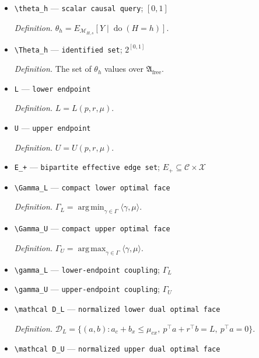 \documentclass{article}
\begin{document}
\begin{itemize}
  \par\smallskip\noindent\emph{Definition.} \(\Gamma=\Gamma(p,r)\).
  \item \texttt{\textbackslash{}\allowbreak{}theta\_\allowbreak{}h} --- \texttt{scalar causal query}; \([0,1]\)
  \par\smallskip\noindent\emph{Definition.} \(\theta_h=E_{\mathcal M_{H,s}}[Y\mid\operatorname{do}(H=h)]\).
  \item \texttt{\textbackslash{}\allowbreak{}Theta\_\allowbreak{}h} --- \texttt{identified set}; \(2^{[0,1]}\)
  \par\smallskip\noindent\emph{Definition.} The set of \(\theta_h\) values over \(\mathfrak A_{\mathrm{free}}\).
  \item \texttt{L} --- \texttt{lower endpoint}
  \par\smallskip\noindent\emph{Definition.} \(L=L(p,r,\mu)\).
  \item \texttt{U} --- \texttt{upper endpoint}
  \par\smallskip\noindent\emph{Definition.} \(U=U(p,r,\mu)\).
  \item \texttt{E\_\allowbreak{}+\allowbreak{}} --- \texttt{bipartite effective edge set}; \(E_+\subseteq\mathcal C\times\mathcal X\)
  \item \texttt{\textbackslash{}\allowbreak{}Gamma\_\allowbreak{}L} --- \texttt{compact lower optimal face}
  \par\smallskip\noindent\emph{Definition.} \(\Gamma_L=\operatorname*{arg\,min}_{\gamma\in\Gamma}\langle\gamma,\mu\rangle\).
  \item \texttt{\textbackslash{}\allowbreak{}Gamma\_\allowbreak{}U} --- \texttt{compact upper optimal face}
  \par\smallskip\noindent\emph{Definition.} \(\Gamma_U=\operatorname*{arg\,max}_{\gamma\in\Gamma}\langle\gamma,\mu\rangle\).
  \item \texttt{\textbackslash{}\allowbreak{}gamma\_\allowbreak{}L} --- \texttt{lower-\allowbreak{}endpoint coupling}; \(\Gamma_L\)
  \item \texttt{\textbackslash{}\allowbreak{}gamma\_\allowbreak{}U} --- \texttt{upper-\allowbreak{}endpoint coupling}; \(\Gamma_U\)
  \item \texttt{\textbackslash{}\allowbreak{}mathcal D\_\allowbreak{}L} --- \texttt{normalized lower dual optimal face}
  \par\smallskip\noindent\emph{Definition.} \(\mathcal D_L=\{(a,b):a_c+b_x\le\mu_{cx},\ p^\top a+r^\top b=L,\ p^\top a=0\}\).
  \item \texttt{\textbackslash{}\allowbreak{}mathcal D\_\allowbreak{}U} --- \texttt{normalized upper dual optimal face}

\end{itemize}
\end{document}
